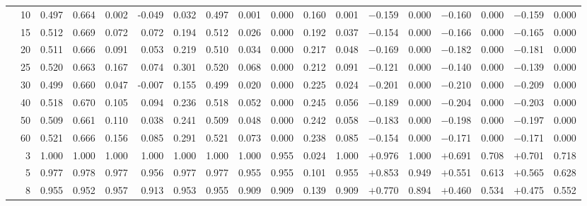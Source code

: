 \begin{table}[ht]
{\begin{tabular}{p{2.2cm}r rrrr rr rr rr rr rr rr}
  & 10 & 0.497 & 0.664 & 0.002 & -0.049 & 0.032 & 0.497 & 0.001 & 0.000 & 0.160 & 0.001 & $-$0.159 & 0.000 & $-$0.160 & 0.000 & $-$0.159 & 0.000 \\
  & 15 & 0.512 & 0.669 & 0.072 & 0.072 & 0.194 & 0.512 & 0.026 & 0.000 & 0.192 & 0.037 & $-$0.154 & 0.000 & $-$0.166 & 0.000 & $-$0.165 & 0.000 \\
  & 20 & 0.511 & 0.666 & 0.091 & 0.053 & 0.219 & 0.510 & 0.034 & 0.000 & 0.217 & 0.048 & $-$0.169 & 0.000 & $-$0.182 & 0.000 & $-$0.181 & 0.000 \\
  & 25 & 0.520 & 0.663 & 0.167 & 0.074 & 0.301 & 0.520 & 0.068 & 0.000 & 0.212 & 0.091 & $-$0.121 & 0.000 & $-$0.140 & 0.000 & $-$0.139 & 0.000 \\
  & 30 & 0.499 & 0.660 & 0.047 & -0.007 & 0.155 & 0.499 & 0.020 & 0.000 & 0.225 & 0.024 & $-$0.201 & 0.000 & $-$0.210 & 0.000 & $-$0.209 & 0.000 \\
  & 40 & 0.518 & 0.670 & 0.105 & 0.094 & 0.236 & 0.518 & 0.052 & 0.000 & 0.245 & 0.056 & $-$0.189 & 0.000 & $-$0.204 & 0.000 & $-$0.203 & 0.000 \\
  & 50 & 0.509 & 0.661 & 0.110 & 0.038 & 0.241 & 0.509 & 0.048 & 0.000 & 0.242 & 0.058 & $-$0.183 & 0.000 & $-$0.198 & 0.000 & $-$0.197 & 0.000 \\
  & 60 & 0.521 & 0.666 & 0.156 & 0.085 & 0.291 & 0.521 & 0.073 & 0.000 & 0.238 & 0.085 & $-$0.154 & 0.000 & $-$0.171 & 0.000 & $-$0.171 & 0.000 \\
\midrule
{}
  & 3  & 1.000 & 1.000 & 1.000 & 1.000 & 1.000 & 1.000 & 1.000 & 0.955 & 0.024 & 1.000 & $+$0.976 & 1.000 & $+$0.691 & 0.708 & $+$0.701 & 0.718 \\
  & 5  & 0.977 & 0.978 & 0.977 & 0.956 & 0.977 & 0.977 & 0.955 & 0.955 & 0.101 & 0.955 & $+$0.853 & 0.949 & $+$0.551 & 0.613 & $+$0.565 & 0.628 \\
  & 8  & 0.955 & 0.952 & 0.957 & 0.913 & 0.953 & 0.955 & 0.909 & 0.909 & 0.139 & 0.909 & $+$0.770 & 0.894 & $+$0.460 & 0.534 & $+$0.475 & 0.552 \\

\end{tabular}}
\end{table}
